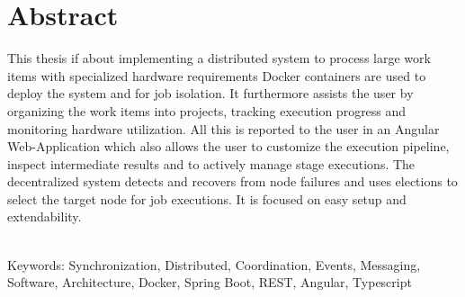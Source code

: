 
\chapter*{Abstract} %

 


This thesis if about implementing a distributed system to process large work items with specialized hardware requirements
Docker containers are used to deploy the system and for job isolation.
It furthermore assists the user by organizing the work items into projects, tracking execution progress and monitoring hardware utilization.
All this is reported to the user in an Angular Web-Application which also allows the user to customize the execution pipeline, inspect intermediate results and to actively manage stage executions.
The decentralized system detects and recovers from node failures and uses elections to select the target node for job executions.
It is focused on easy setup and extendability.

~\\
Keywords: Synchronization, Distributed, Coordination, Events, Messaging, Software, Architecture, Docker, Spring Boot, REST, Angular, Typescript